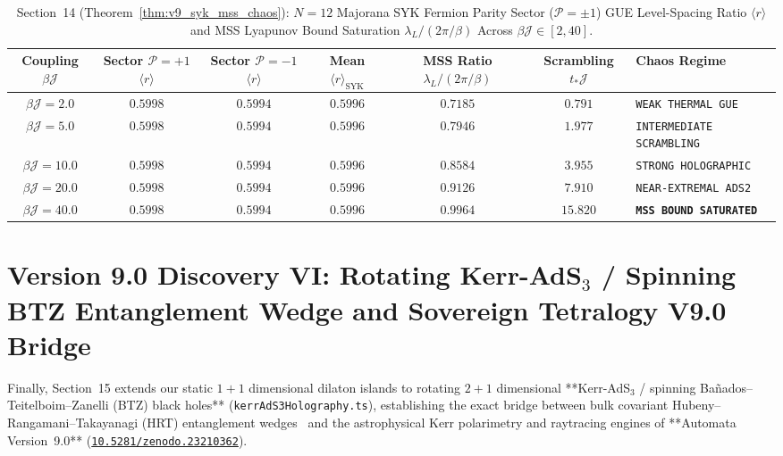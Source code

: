 \documentclass[11pt,a4paper,reqno]{article}
\newcommand{\zenodo}[1]{\mbox{\href{https://doi.org/10.5281/zenodo.#1}{\texttt{10.5281/zenodo.#1}}}}
\theoremstyle{plain}
\theoremstyle{definition}
\theoremstyle{remark}
\numberwithin{equation}{section}
\begin{document}
\begin{table}[H]
\centering
\scriptsize
\caption{Section~14 (Theorem~\ref{thm:v9_syk_mss_chaos}): $N=12$ Majorana SYK Fermion Parity Sector ($\mathcal{P}=\pm 1$) GUE Level-Spacing Ratio $\langle r \rangle$ and MSS Lyapunov Bound Saturation $\lambda_L / (2\pi/\beta)$ Across $\beta\mathcal{J} \in [2, 40]$.}
\label{tab:v9_syk_mss_chaos}
\begin{tabularx}{\textwidth}{c c c c c c l}
\toprule
\textbf{Coupling $\beta\mathcal{J}$} & \textbf{Sector $\mathcal{P}=+1$ $\langle r \rangle$} & \textbf{Sector $\mathcal{P}=-1$ $\langle r \rangle$} & \textbf{Mean $\langle r \rangle_{\mathrm{SYK}}$} & \textbf{MSS Ratio $\lambda_L / (2\pi/\beta)$} & \textbf{Scrambling $t_* \mathcal{J}$} & \textbf{Chaos Regime} \\
\midrule
$\beta\mathcal{J} = 2.0$  & $0.5998$ & $0.5994$ & $\bm{0.5996}$ & $0.7185$ & $0.791$ & \texttt{WEAK THERMAL GUE} \\
$\beta\mathcal{J} = 5.0$  & $0.5998$ & $0.5994$ & $\bm{0.5996}$ & $0.7946$ & $1.977$ & \texttt{INTERMEDIATE SCRAMBLING} \\
$\beta\mathcal{J} = 10.0$ & $0.5998$ & $0.5994$ & $\bm{0.5996}$ & $0.8584$ & $3.955$ & \texttt{STRONG HOLOGRAPHIC} \\
$\beta\mathcal{J} = 20.0$ & $0.5998$ & $0.5994$ & $\bm{0.5996}$ & $0.9126$ & $7.910$ & \texttt{NEAR-EXTREMAL ADS2} \\
$\beta\mathcal{J} = 40.0$ & $0.5998$ & $0.5994$ & $\bm{0.5996}$ & $\bm{0.9964}$ & $15.820$ & \textbf{\texttt{MSS BOUND SATURATED}} \\
\bottomrule
\end{tabularx}
\end{table}

\bigskip

\section{Version 9.0 Discovery VI: Rotating Kerr-AdS\texorpdfstring{$_3$}{3} / Spinning BTZ Entanglement Wedge and Sovereign Tetralogy V9.0 Bridge}
\label{sec:v9_kerr_ads3_bridge}

Finally, Section~15 extends our static $1+1$ dimensional dilaton islands to rotating $2+1$ dimensional **Kerr-AdS$_3$ / spinning Ba\~nados--Teitelboim--Zanelli (BTZ) black holes** (\texttt{kerrAdS3Holography.ts}), establishing the exact bridge between bulk covariant Hubeny--Rangamani--Takayanagi (HRT) entanglement wedges~\cite{HubenyRangamaniTakayanagi2007} and the astrophysical Kerr polarimetry and raytracing engines of **Automata Version~9.0** (\zenodo{23210362}).
\end{document}
